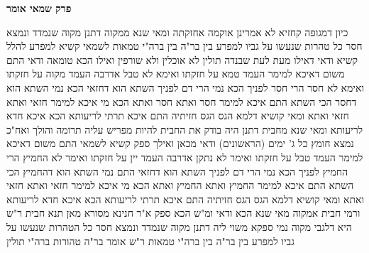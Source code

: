 \documentclass[12pt, openany]{book}
\newcommand{\sethebfont}{
\fontsize{10.5pt}{21.0pt} \selectfont
}
\newcommand{\twocol}[1]{
	{\sethebfont \begin{multicols}{2}
			#1
	\end{multicols}}	
}
\newcommand{\chapname}{}
\newcommand{\newchap}[1]{
	\addcontentsline{toc}{chapter}{#1}
	\renewcommand{\chapname}{#1}
		\begin{center}
			\textbf{%
\fontsize{16pt}{16pt}\selectfont
				#1}
		\end{center}
}
\begin{document}
\newchap{פרק  שמאי אומר}
\twocol{כיון דמגופה קחזיא לא אמרינן אוקמה אחזקתה 
ומאי שנא ממקוה  דתנן  מקוה שנמדד ונמצא חסר כל טהרות שנעשו על גביו למפרע בין בר"ה בין ברה"י טמאות 
לשמאי קשיא למפרע 
להלל קשיא ודאי דאילו מעת לעת שבנדה תולין לא אוכלין ולא שורפין ואילו הכא טומאה ודאי 
התם משום דאיכא למימר  העמד טמא על חזקתו ואימא לא טבל  אדרבה העמד מקוה על חזקתו ואימא לא חסר  הרי חסר לפניך 
הכא נמי  הרי דם לפניך  השתא הוא דחזאי  הכא נמי  השתא הוא דחסר 
הכי השתא  התם איכא למימר חסר ואתא חסר ואתא הכא מי איכא למימר חזאי ואתא חזאי ואתא  ומאי קושיא  דלמא הגס הגס חזיתיה 
התם איכא תרתי לריעותא הכא איכא חדא לריעותא 
ומאי שנא מחבית  דתנן  היה בודק את החבית להיות מפריש עליה תרומה והולך ואח"כ נמצא חומץ כל ג' ימים (הראשונים) ודאי
מכאן ואילך ספק  קשיא לשמאי 
התם משום דאיכא למימר  העמד טבל על חזקתו ואימר לא נתקן  אדרבה העמד יין על חזקתו ואימר לא החמיץ 
הרי החמיץ לפניך  הכא נמי הרי דם לפניך  השתא הוא דחזאי  התם נמי השתא הוא דהחמיץ 
הכי השתא  התם איכא למימר  החמיץ ואתא החמיץ ואתא הכא מי איכא למימר  חזאי ואתא חזאי ואתא  ומאי קושיא דלמא הגס הגס חזיתיה 
התם איכא תרתי לריעותא הכא איכא חדא לריעותא 
ורמי חבית אמקוה  מאי שנא הכא ודאי ומ"ש הכא ספק 
א"ר חנינא מסורא  מאן תנא חבית ר"ש היא דלגבי מקוה נמי ספקא משוי ליה 
דתנן  מקוה שנמדד ונמצא חסר  כל הטהרות שנעשו על גביו למפרע בין בר"ה בין ברה"י טמאות 
ר"ש אומר  בר"ה טהורות ברה"י תולין}
\end{document}
